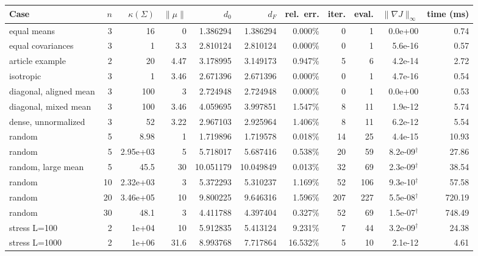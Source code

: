 \begin{tabular}{lrrrrrrrrrr}
\toprule
Case & $n$ & $\kappa(\Sigma)$ & $\|\mu\|$ & $d_0$ & $d_F$ & rel.\ err. & iter. & eval. & $\|\nabla J\|_\infty$ & time (ms) \\
\midrule
equal means & 3 & 16 & 0 & 1.386294 & 1.386294 & 0.000\% & 0 & 1 & 0.0e+00 & 0.74 \\
equal covariances & 3 & 1 & 3.3 & 2.810124 & 2.810124 & 0.000\% & 0 & 1 & 5.6e-16 & 0.57 \\
article example & 2 & 20 & 4.47 & 3.178995 & 3.149173 & 0.947\% & 5 & 6 & 4.2e-14 & 2.72 \\
isotropic & 3 & 1 & 3.46 & 2.671396 & 2.671396 & 0.000\% & 0 & 1 & 4.7e-16 & 0.54 \\
diagonal, aligned mean & 3 & 100 & 3 & 2.724948 & 2.724948 & 0.000\% & 0 & 1 & 0.0e+00 & 0.53 \\
diagonal, mixed mean & 3 & 100 & 3.46 & 4.059695 & 3.997851 & 1.547\% & 8 & 11 & 1.9e-12 & 5.74 \\
dense, unnormalized & 3 & 52 & 3.22 & 2.967103 & 2.925964 & 1.406\% & 8 & 11 & 6.2e-12 & 5.54 \\
random & 5 & 8.98 & 1 & 1.719896 & 1.719578 & 0.018\% & 14 & 25 & 4.4e-15 & 10.93 \\
random & 5 & 2.95e+03 & 5 & 5.718017 & 5.687416 & 0.538\% & 20 & 59 & 8.2e-09$^\dagger$ & 27.86 \\
random, large mean & 5 & 45.5 & 30 & 10.051179 & 10.049849 & 0.013\% & 32 & 69 & 2.3e-09$^\dagger$ & 38.54 \\
random & 10 & 2.32e+03 & 3 & 5.372293 & 5.310237 & 1.169\% & 52 & 106 & 9.3e-10$^\dagger$ & 57.58 \\
random & 20 & 3.46e+05 & 10 & 9.800225 & 9.646316 & 1.596\% & 207 & 227 & 5.5e-08$^\dagger$ & 720.19 \\
random & 30 & 48.1 & 3 & 4.411788 & 4.397404 & 0.327\% & 52 & 69 & 1.5e-07$^\dagger$ & 748.49 \\
stress L=100 & 2 & 1e+04 & 10 & 5.912835 & 5.413124 & 9.231\% & 7 & 44 & 3.2e-09$^\dagger$ & 24.38 \\
stress L=1000 & 2 & 1e+06 & 31.6 & 8.993768 & 7.717864 & 16.532\% & 5 & 10 & 2.1e-12 & 4.61 \\
\bottomrule
\end{tabular}
